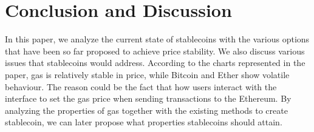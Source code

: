 \section{Conclusion and Discussion}
In this paper, we analyze the current state of stablecoins with the various options that have been so far proposed to achieve price stability. We also discuss various issues that stablecoins would address. According to the charts represented in the paper, gas is relatively stable in price, while Bitcoin and Ether show volatile behaviour. The reason could be the fact that how users interact with the interface to set the gas price when sending transactions to the Ethereum. By analyzing the properties of gas together with the existing methods to create stablecoin, we can later propose what properties stablecoins should attain.

